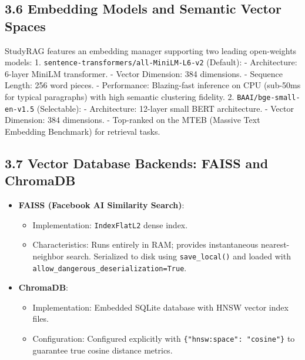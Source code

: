 \documentclass[
]{article}
\providecommand{\tightlist}{%
  \setlength{\itemsep}{0pt}\setlength{\parskip}{0pt}}
\begin{document}
\subsection{3.6 Embedding Models and Semantic Vector
Spaces}\label{embedding-models-and-semantic-vector-spaces}

StudyRAG features an embedding manager supporting two leading
open-weights models: 1. \texttt{sentence-transformers/\allowbreak all-MiniLM-L6-v2}
(Default): - Architecture: 6-layer MiniLM transformer. - Vector
Dimension: 384 dimensions. - Sequence Length: 256 word pieces. -
Performance: Blazing-fast inference on CPU (sub-50ms for typical
paragraphs) with high semantic clustering fidelity. 2.
\texttt{BAAI/\allowbreak bge-small-en-v1.5} (Selectable): - Architecture: 12-layer
small BERT architecture. - Vector Dimension: 384 dimensions. -
Top-ranked on the MTEB (Massive Text Embedding Benchmark) for retrieval
tasks.

\subsection{3.7 Vector Database Backends: FAISS and
ChromaDB}\label{vector-database-backends-faiss-and-chromadb}

\begin{itemize}
\tightlist
\item
  \textbf{FAISS (Facebook AI Similarity Search)}:

  \begin{itemize}
  \tightlist
  \item
    Implementation: \texttt{IndexFlatL2} dense index.
  \item
    Characteristics: Runs entirely in RAM; provides instantaneous
    nearest-neighbor search. Serialized to disk using
    \texttt{save\_\allowbreak local(\allowbreak )\allowbreak } and loaded with
    \texttt{allow\_\allowbreak dangerous\_\allowbreak deserialization=\allowbreak True}.
  \end{itemize}
\item
  \textbf{ChromaDB}:

  \begin{itemize}
  \tightlist
  \item
    Implementation: Embedded SQLite database with HNSW vector index
    files.
  \item
    Configuration: Configured explicitly with
    \texttt{\{"hnsw:space":\ \allowbreak "cosine"\}} to guarantee true cosine
    distance metrics.
  \end{itemize}
\end{itemize}
\end{document}
